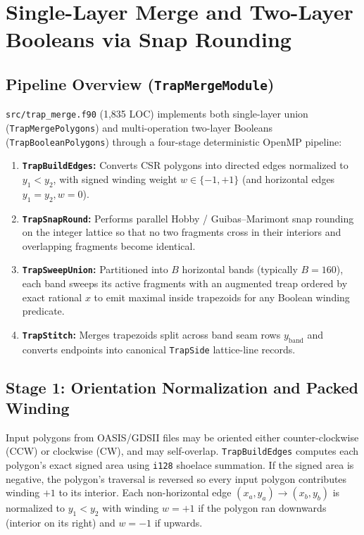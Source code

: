 \chapter{Single-Layer Merge and Two-Layer Booleans via Snap Rounding}
\label{ch:merge_bool}

\section{Pipeline Overview (\texttt{TrapMergeModule})}

\texttt{src/trap\_merge.f90} (1,835 LOC) implements both single-layer union (\texttt{TrapMergePolygons}) and multi-operation two-layer Booleans (\texttt{TrapBooleanPolygons}) through a four-stage deterministic OpenMP pipeline:
\begin{enumerate}
  \item \textbf{\texttt{TrapBuildEdges}:} Converts CSR polygons into directed edges normalized to $y_1 < y_2$, with signed winding weight $w \in \{-1, +1\}$ (and horizontal edges $y_1 = y_2, w = 0$).
  \item \textbf{\texttt{TrapSnapRound}:} Performs parallel Hobby / Guibas--Marimont snap rounding on the integer lattice so that no two fragments cross in their interiors and overlapping fragments become identical.
  \item \textbf{\texttt{TrapSweepUnion}:} Partitioned into $B$ horizontal bands (typically $B = 160$), each band sweeps its active fragments with an augmented treap ordered by exact rational $x$ to emit maximal inside trapezoids for any Boolean winding predicate.
  \item \textbf{\texttt{TrapStitch}:} Merges trapezoids split across band seam rows $y_{\text{band}}$ and converts endpoints into canonical \texttt{TrapSide} lattice-line records.
\end{enumerate}

\section{Stage 1: Orientation Normalization and Packed Winding}

Input polygons from OASIS/GDSII files may be oriented either counter-clockwise (CCW) or clockwise (CW), and may self-overlap. \texttt{TrapBuildEdges} computes each polygon's exact signed area using \texttt{i128} shoelace summation. If the signed area is negative, the polygon's traversal is reversed so every input polygon contributes winding $+1$ to its interior. Each non-horizontal edge $(x_a, y_a) \to (x_b, y_b)$ is normalized to $y_1 < y_2$ with winding $w = +1$ if the polygon ran downwards (interior on its right) and $w = -1$ if upwards.

